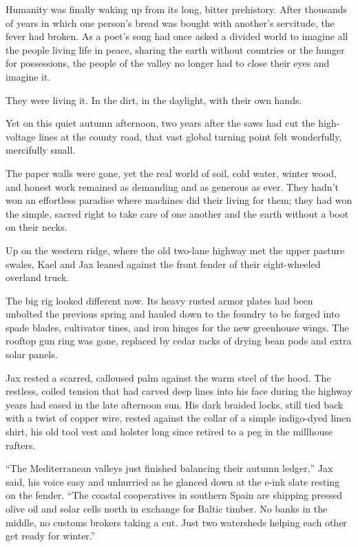 Humanity was finally waking up from its long, bitter prehistory. After thousands of years in which one person’s bread was bought with another’s servitude, the fever had broken. As a poet's song had once asked a divided world to imagine all the people living life in peace, sharing the earth without countries or the hunger for possessions, the people of the valley no longer had to close their eyes and imagine it. 

They were living it. In the dirt, in the daylight, with their own hands.

Yet on this quiet autumn afternoon, two years after the saws had cut the high-voltage lines at the county road, that vast global turning point felt wonderfully, mercifully small.

The paper walls were gone, yet the real world of soil, cold water, winter wood, and honest work remained as demanding and as generous as ever. They hadn't won an effortless paradise where machines did their living for them; they had won the simple, sacred right to take care of one another and the earth without a boot on their necks.

Up on the western ridge, where the old two-lane highway met the upper pasture swales, Kael and Jax leaned against the front fender of their eight-wheeled overland truck. 

The big rig looked different now. Its heavy rusted armor plates had been unbolted the previous spring and hauled down to the foundry to be forged into spade blades, cultivator tines, and iron hinges for the new greenhouse wings. The rooftop gun ring was gone, replaced by cedar racks of drying bean pods and extra solar panels. 

Jax rested a scarred, calloused palm against the warm steel of the hood. The restless, coiled tension that had carved deep lines into his face during the highway years had eased in the late afternoon sun. His dark braided locks, still tied back with a twist of copper wire, rested against the collar of a simple indigo-dyed linen shirt, his old tool vest and holster long since retired to a peg in the millhouse rafters.

``The Mediterranean valleys just finished balancing their autumn ledger,'' Jax said, his voice easy and unhurried as he glanced down at the e-ink slate resting on the fender. ``The coastal cooperatives in southern Spain are shipping pressed olive oil and solar cells north in exchange for Baltic timber. No banks in the middle, no customs brokers taking a cut. Just two watersheds helping each other get ready for winter.''

